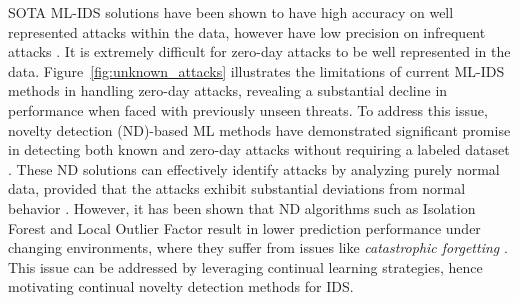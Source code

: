SOTA ML-IDS solutions have been shown to have high accuracy on well represented attacks within the data, however have low precision on infrequent attacks \cite{macas2022survey}. It is extremely difficult for zero-day attacks to be well represented in the data. Figure~\ref{fig:unknown_attacks} illustrates the limitations of current ML-IDS methods in handling zero-day attacks, revealing a substantial decline in performance when faced with previously unseen threats. To address this issue, novelty detection (ND)-based ML methods have demonstrated significant promise in detecting both known and zero-day attacks without requiring a labeled dataset \cite{verkerken2022towards}. 
These ND solutions can effectively identify attacks by analyzing purely normal data, provided that the attacks exhibit substantial deviations from normal behavior \cite{verkerken2022towards}. 
However, it has been shown that ND algorithms such as Isolation Forest and Local Outlier Factor
result in lower prediction performance under changing environments, where they suffer from issues like \textit{catastrophic forgetting} \cite{Faber_2024}. 
This issue can be addressed by leveraging continual learning strategies, hence motivating continual novelty detection methods for IDS. 

